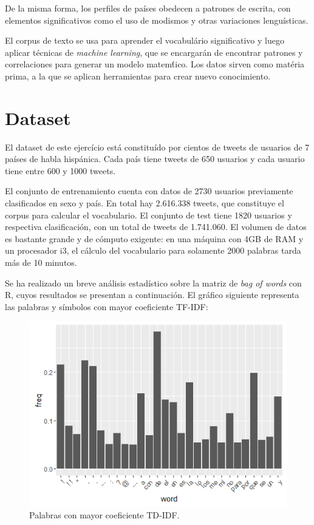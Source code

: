 \documentclass[11pt,a4paper]{article}
\begin{document}
  De la misma forma, los perfiles de pa\'ises obedecen a patrones de escrita, con elementos significativos como el uso de modismos y otras variaciones lengu\'isticas. 
  
  El corpus de texto se usa para aprender el vocabul\'ario significativo y luego aplicar t\'ecnicas de {\em machine learning}, que se encargar\'an de encontrar patrones y correlaciones para generar un modelo matem\'tico. Los datos sirven como mat\'eria prima, a la que se aplican herramientas para crear nuevo conocimiento.


\section{Dataset}

  El dataset de este ejerc\'icio est\'a constitu\'ido por cientos de tweets de usuarios de 7 pa\'ises de habla hisp\'anica. Cada pa\'is tiene tweets de 650 usuarios y cada usuario tiene entre 600 y 1000 tweets. 
  
  El conjunto de entrenamiento cuenta con datos de 2730 usuarios previamente clasificados en sexo y pa\'is. En total hay 2.616.338 tweets, que constituye el corpus para calcular el vocabulario. El conjunto de test tiene 1820 usuarios y respectiva clasificaci\'on, con un total de tweets de 1.741.060. El volumen de datos es bastante grande y de c\'omputo exigente: en una m\'aquina con 4GB de RAM y un procesador i3, el c\'alculo del vocabulario para solamente 2000 palabras tarda m\'as de 10 minutos.
  
  Se ha realizado un breve an\'alisis estad\'istico sobre la matriz de {\em bag of words} con R, cuyos resultados se presentan a continuaci\'on. El gr\'afico siguiente representa las palabras y s\'imbolos con mayor coeficiente TF-IDF:
  
  \begin{figure}[ht!]
    \includegraphics[width=\linewidth]{most_used_words.png}
    \caption{Palabras con mayor coeficiente TD-IDF.}
    \label{fig:most_used_words}
  \end{figure}
  
\end{document}
